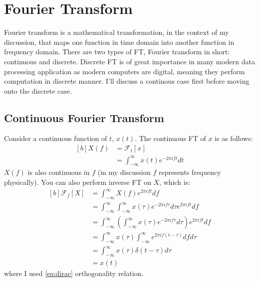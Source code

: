 \documentclass[letterpaper, 11pt]{article}
\newcommand{\fourier}[2]{\mathcal{F}_{#1}[#2]} %
\newcommand{\fint}{\int_{-\infty}^{\infty}} %
\newcommand{\ft}[2]{\fint #2 e^{-2\pi if#1} d#1} %
\newcommand{\ift}[2]{\fint #2 e^{2\pi i#1t} d#1} %
\numberwithin{equation}{section}
\begin{document}
\section{Fourier Transform}
Fourier transform is a mathematical transformation, in the context of my discussion, that maps one function in time domain into another function in frequency domain. There are two types of FT, Fourier transform in short: continuous and discrete. Discrete FT is of great importance in many modern data processing application as modern computers are digital, meaning they perform computation in discrete manner. I'll discuss a continous case first before moving onto the discrete case.

\subsection{Continuous Fourier Transform}
Consider a continuous function of \(t\), \(x(t)\). The continuous FT of \(x\) is as follows:
\begin{equation}
	\begin{aligned}[b]
		X(f)	&=\fourier{t}{x} \\
			&=\ft{t}{x(t)}
	\end{aligned}
\end{equation}
\(X(f)\) is also continuous in \(f\) (in my discussion \(f\) represents frequency physically). You can also perform inverse FT on \(X\), which is:
\begin{equation}
	\begin{aligned}[b]
		\fourier{f}{X}	&= \ift{f}{X(f)} \\
				&= \ift{f}{\ft{\tau}{x(\tau)}}\\
				&= \ift{f}{\left ( \ft{\tau}{x(\tau)}\right )} \\
				&= \fint x(\tau) \fint e^{2\pi if(t - \tau)} df d\tau \\
				&= \fint x(\tau) \delta (t - \tau) d\tau \\
				&= x(t)
	\end{aligned}
\end{equation}
where I used \eqref{eq:dirac} orthogonality relation.
\end{document}

